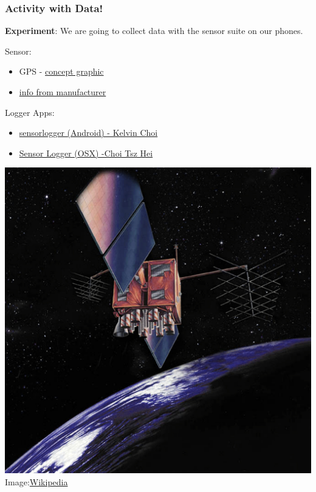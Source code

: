 \documentclass[fleqn]{beamer} %
\newcommand{\sectiontitleIV}{Activity with Data!}
\begin{document}
	\begin{frame}[label=sectionIV]
		\frametitle{\sectiontitleIV}
		\scriptsize
		{\bf Experiment}: We are going to collect data with the sensor suite on our phones. \vspc
		
		\begin{multicols}{2}
		    Sensor:
		    \begin{itemize}
		    	\item GPS - \href{https://en.wikipedia.org/wiki/File:ConstellationGPS.gif}{concept graphic} 
		    	\item \href{https://www.garmin.com/en-US/aboutgps/}{info from manufacturer}  
		    \end{itemize}

		    Logger Apps:
			\begin{itemize}
				\item \href{https://www.tszheichoi.com/sensorlogger}{sensorlogger (Android) - Kelvin Choi} \vspc
				\item \href{https://apps.apple.com/us/app/sensor-logger/id1531582925}{Sensor Logger (OSX) -Choi Tsz Hei}
			\end{itemize}

			\includegraphics[scale=.075,angle=-90,origin=c]{GPS-IIR.jpeg}
			{\tiny Image:\href{https://en.wikipedia.org/wiki/Global_Positioning_System}{Wikipedia}}
		\end{multicols}	

	\end{frame}
\end{document}

